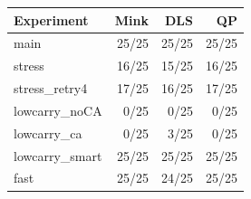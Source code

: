 \begin{tabular}{lrrr}
\toprule
Experiment & Mink & DLS & QP\\
\midrule
main & 25/25 & 25/25 & 25/25\\
stress & 16/25 & 15/25 & 16/25\\
stress\_retry4 & 17/25 & 16/25 & 17/25\\
lowcarry\_noCA & 0/25 & 0/25 & 0/25\\
lowcarry\_ca & 0/25 & 3/25 & 0/25\\
lowcarry\_smart & 25/25 & 25/25 & 25/25\\
fast & 25/25 & 24/25 & 25/25\\
\bottomrule
\end{tabular}
